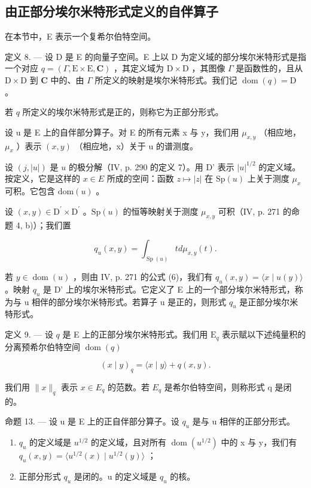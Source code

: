 \subsection{由正部分埃尔米特形式定义的自伴算子}

在本节中，E 表示一个复希尔伯特空间。

定义 8. --- 设 D 是 E 的向量子空间。E 上以 D 为定义域的部分埃尔米特形式是指一个对应 \(q = (\Gamma, \mathrm{E} \times \mathrm{E}, \mathbf{C})\) ，其定义域为 \(\mathrm{D} \times \mathrm{D}\) ，其图像 \(\Gamma\) 是函数性的，且从 \(\mathrm{D} \times \mathrm{D}\) 到 \(\mathbf{C}\) 中的、由 \(\Gamma\) 所定义的映射是埃尔米特形式。我们记 \(\operatorname{dom}(q) = \mathrm{D}\) 。

若 \(q\) 所定义的埃尔米特形式是正的，则称它为正部分形式。

设 u 是 E 上的自伴部分算子。对 E 的所有元素 x 与 y，我们用 \(\mu_{x,y}\) （相应地，\(\mu_{x}\) ）表示 \((x,y)\) （相应地，x）关于 u 的谱测度。

设 \((j, |u|)\) 是 \(u\) 的极分解（IV, p. 290 的定义 7）。用 D' 表示 \(|u|^{1/2}\) 的定义域。按定义，它是这样的 \(x \in E\) 所成的空间：函数 \(z \mapsto |z|\) 在 \(\mathrm{Sp}(u)\) 上关于测度 \(\mu_x\) 可积。它包含 \(\mathrm{dom}(u)\) 。

设 \((x,y)\in\mathrm{D}^{\prime}\times\mathrm{D}^{\prime}\) 。\(\mathrm{Sp}(u)\) 的恒等映射关于测度 \(\mu_{x,y}\) 可积（IV, p. 271 的命题 4, b)）；我们置

\[
q _ {u} (x, y) = \int_ {\operatorname{Sp} (u)} t d \mu_ {x, y} (t).
\]

若 \(y \in \operatorname{dom}(u)\) ，则由 IV, p. 271 的公式 (6)，我们有 \(q_u(x, y) = \langle x \mid u(y) \rangle\) 。映射 \(q_u\) 是 D' 上的埃尔米特形式。它定义了 E 上的一个部分埃尔米特形式，称为与 u 相伴的部分埃尔米特形式。若算子 u 是正的，则形式 \(q_u\) 是正部分埃尔米特形式。

定义 9. --- 设 \(q\) 是 E 上的正部分埃尔米特形式。我们用 \(\mathrm{E}_q\) 表示赋以下述纯量积的分离预希尔伯特空间 \(\operatorname{dom}(q)\)

\[
(x \mid y) _ {q} = \langle x \mid y \rangle + q (x, y).
\]

我们用 \(\|x\|_{q}\) 表示 \(x \in E_{q}\) 的范数。若 \(E_{q}\) 是希尔伯特空间，则称形式 q 是闭的。

命题 13. --- 设 u 是 E 上的正自伴部分算子。设 \(q_{u}\) 是与 u 相伴的正部分形式。

\begin{enumerate}
\def\labelenumi{\alph{enumi})}
\item
  \(q_{u}\) 的定义域是 \(u^{1/2}\) 的定义域，且对所有 \(\operatorname{dom}(u^{1/2})\) 中的 x 与 y，我们有 \(q_{u}(x,y)=\langle u^{1/2}(x)\mid u^{1/2}(y)\rangle\) ；
\item
  正部分形式 \(q_{u}\) 是闭的。u 的定义域是 \(q_{u}\) 的核。
\end{enumerate}

